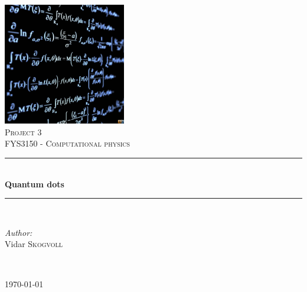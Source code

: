 \documentclass[a4paper,10pt,english]{article}
\numberwithin{figure}{subsection}
\numberwithin{table}{subsection}
\numberwithin{equation}{subsection}
\newcommand{\HRule}{\rule{\linewidth}{0.5mm}}
\begin{document}
\pagestyle{fancy}
\renewcommand{\sectionmark}[1]{\markright{#1}{}}

\pagestyle{fancy}
\renewcommand{\sectionmark}[1]{\markright{\thesection\ #1}}

\fancyhf{}
\lhead{\fancyplain{}{\rightmark }} %
\cfoot{\fancyplain{}{\thepage}}


\begin{titlepage}
\begin{center}

\includegraphics[width=0.4\textwidth]{forside.jpg}~\\[1cm]

\textsc{\LARGE Project 3}\\[1.5cm]

\textsc{\Large FYS3150 - Computational physics}\\[0.5cm]

\HRule \\[0.4cm]
{ \huge \bfseries Quantum dots \\[0.4cm] }

\HRule \\[1.5cm]

\begin{minipage}{0.4\textwidth}
\begin{flushleft} \large
\emph{Author:}\\
Vidar \textsc{Skogvoll}
\end{flushleft}
\end{minipage}
\begin{minipage}{0.4\textwidth}
\begin{flushright} \large
\emph{ } \\
 \textsc{ }
\end{flushright}
\end{minipage}

\vfill

{\large \today}

\end{center}
\end{titlepage}
\setcounter{page}{2}
\end{document}
